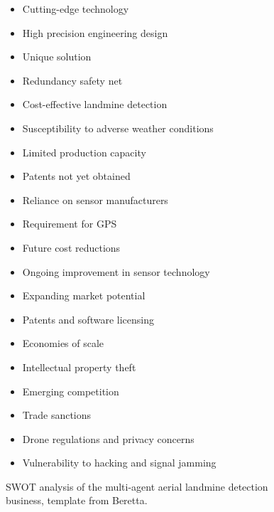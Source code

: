 \begin{figure}[H]
\centering
\begin{tcbraster}[raster columns=2, boxrule=0mm, arc=0mm]
\begin{tcolorbox}[equal height group=A, size=fbox, colback=swotS!60, colframe=swotS!80!black, title=\textsc{\textbf{STRENGTHS}}]
\begin{itemize}
    \item Cutting-edge technology
    \item High precision engineering design
    \item Unique solution
    \item Redundancy safety net
    \item Cost-effective landmine detection
\end{itemize}
\end{tcolorbox}
\begin{tcolorbox}[equal height group=A, size=fbox, colback=swotW!60, colframe=swotW!80!black, title=\textsc{\textbf{WEAKNESSES}}]
\begin{itemize}
    \item Susceptibility to adverse weather conditions
    \item Limited production capacity
    \item Patents not yet obtained
    \item Reliance on sensor manufacturers
    \item Requirement for GPS
\end{itemize}
\end{tcolorbox}
\begin{tcolorbox}[equal height group=A, size=fbox, colback=swotO!60, colframe=swotO!80!black, title=\textsc{\textbf{OPPORTUNITIES}}]
\begin{itemize}
    \item Future cost reductions
    \item Ongoing improvement in sensor technology
    \item Expanding market potential
    \item Patents and software licensing
    \item Economies of scale
\end{itemize}
\end{tcolorbox}
\begin{tcolorbox}[equal height group=A, size=fbox, colback=swotT!60, colframe=swotT!80!black, title=\textsc{\textbf{THREATS}}]
\begin{itemize}
    \item Intellectual property theft
    \item Emerging competition
    \item Trade sanctions
    \item Drone regulations and privacy concerns
    \item Vulnerability to hacking and signal jamming
\end{itemize}
\end{tcolorbox}
\end{tcbraster}
\caption{SWOT analysis of the multi-agent aerial landmine detection business, template from Beretta.}
\label{fig:swot}
\end{figure}



